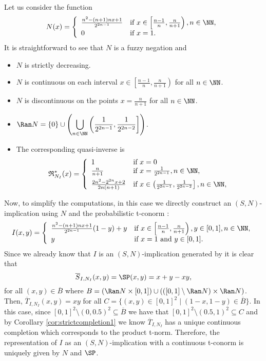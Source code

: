 \begin{example}\label{example:negationnumerablediscont}
Let us consider the function
	$$
	N(x) =
	\left\{ \begin{array}{ll}
		\frac{n^2-(n+1)nx+1}{2^{2n-1}} &   \text{if }   x\in \left[\frac{n-1}{n}, \frac{n}{n+1}\right), n \in \NN, \\
		0 &   \text{if }   x = 1.
	\end{array} \right.
	$$
	It is straightforward to see that $N$ is a fuzzy negation and
	\begin{itemize}
		\item $N$ is strictly decreasing.
		\item $N$ is continuous on each interval $x\in \left[\frac{n-1}{n}, \frac{n}{n+1}\right)$ for all $n \in \NN$.
		\item $N$ is discontinuous on the points $x=\frac{n}{n+1}$ for all $n \in \NN$.
		\item $\displaystyle \Ran N = \{0\} \cup \left( \bigcup_{n \in \NN}  \left(\frac{1}{2^{2n-1}}, \frac{1}{2^{2n-2}}\right\rbrack  \right)$.
		\item The corresponding quasi-inverse is
		$$
		\mathfrak{R}^*_{N_{I}}(x) =
		\left\{ \begin{array}{ll}
			1 & \text{if } x=0 \\
			\frac{n}{n+1} &   \text{if }   x = \frac{1}{2^{2n-1}}, n \in \NN, \\[5pt]
			\frac{2n^2-2^{2n}x+2}{2n(n+1)} &   \text{if }  x \in \left(\frac{1}{2^{2n-1}}, \frac{1}{2^{2n-2}}\right\rbrack, n \in \NN, \\
		\end{array} \right.
		$$
	\end{itemize}
	Now, to simplify the computations, in this case we directly construct an $(S,N)$-implication using $N$ and the probabilistic t-conorm \SP:
	$$
	I(x,y) =
	\left\{ \begin{array}{ll}
		\frac{n^2-(n+1)nx+1}{2^{2n-1}}(1-y)+y &   \text{if }   x\in \left[\frac{n-1}{n}, \frac{n}{n+1}\right), y \in [0,1], n \in \NN, \\
		y &   \text{if }   x=1 \text{ and } y \in [0,1].
	\end{array} \right.
	$$
	Since we already know that $I$ is an $(S,N)$-implication generated by \SP it is clear that
	$$\overline{S}_{I,N_I}(x,y)= \SP(x,y)=x+y-xy,$$
	for all $(x,y) \in \overline{B}$ where $B= (\Ran N \times [0,1]) \cup (([0,1]\setminus \Ran N) \times \Ran N)$. Then, $\overline{T}_{I,N_I}(x,y)=xy$ for all $C = \{(x,y) \in [0,1]^2 \mid (1-x,1-y) \in \overline{B}\}$. In this case, since $[0,1]^2 \setminus (0,0.5)^2 \subseteq \overline{B}$ we have that $[0,1]^2 \setminus (0.5,1)^2 \subseteq C$ and by Corollary \ref{cor:strictcompletion1} we know $\overline{T}_{I,N_I}$ has a unique continuous completion  which corresponds to the product t-norm. Therefore, the representation of $I$ as an $(S,N)$-implication with a continuous t-conorm is uniquely given by $N$ and $\SP$.
\end{example}

